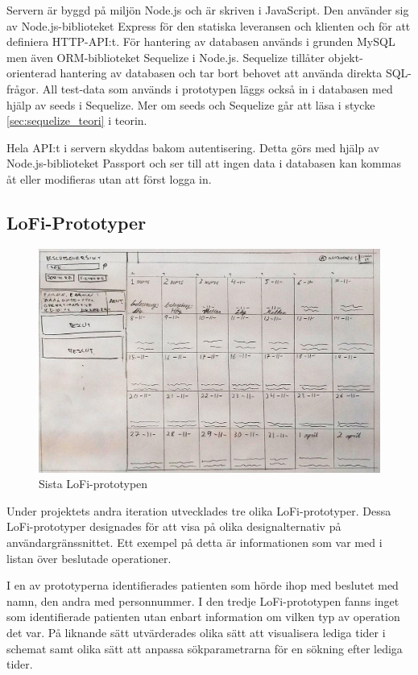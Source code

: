 Servern är byggd på miljön Node.js och är skriven i JavaScript. Den använder sig av Node.js-biblioteket Express för den statiska leveransen och klienten och för att definiera HTTP-API:t. För hantering av databasen används i grunden MySQL men även ORM-biblioteket Sequelize i Node.js. Sequelize tillåter objekt-orienterad hantering av databasen och tar bort behovet att använda direkta SQL-frågor. All test-data som används i prototypen läggs också in i databasen med hjälp av seeds i Sequelize. Mer om seeds och Sequelize går att läsa i stycke \ref{sec:sequelize_teori} i teorin.

Hela API:t i servern skyddas bakom autentisering. Detta görs med hjälp av Node.js-biblioteket Passport och ser till att ingen data i databasen kan kommas åt eller modifieras utan att först logga in.

\subsection{LoFi-Prototyper}

\begin{figure}[H]
  \includegraphics[width=\linewidth]{Figures/LoFi_no2.jpg}
  \caption{Sista LoFi-prototypen}
  \label{fig:LofiPic}
\end{figure}


Under projektets andra iteration utvecklades tre olika LoFi-prototyper. Dessa
LoFi-prototyper designades för att visa på olika designalternativ på
användargränssnittet. Ett exempel på detta är informationen som var med i listan
över beslutade operationer.

I en av prototyperna identifierades patienten som hörde ihop med beslutet med namn, den andra med personnummer. I den tredje LoFi-prototypen
fanns inget som identifierade patienten utan enbart information om vilken
typ av operation det var. På liknande sätt utvärderades olika sätt att
visualisera lediga tider i schemat samt olika sätt att anpassa sökparametrarna för en sökning efter lediga tider.

